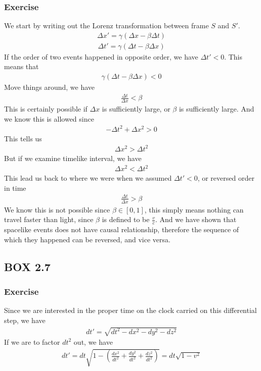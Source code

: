 \documentclass[12pt]{book}
\newcommand{\dydx}[2]{\frac{d #1}{d #2}}
\newcommand{\sqbkt}[1]{\left[ #1 \right]}
\newcommand{\paren}[1]{\left( #1 \right)}
\begin{document}
    \subsubsection{Exercise}
    We start by writing out the Lorenz transformation between frame $S$ and $S'$.
    \begin{align}
    \Delta x' = \gamma\paren{\Delta x - \beta \Delta t}
    \end{align}
    \begin{align}
    \Delta t' = \gamma\paren{\Delta t - \beta \Delta x}
    \end{align}
    If the order of two events happened in opposite order, we have $\Delta t' < 0$. This means that
    \begin{align}
    \gamma\paren{\Delta t - \beta \Delta x} < 0
    \end{align}
    Move things around, we have
    \begin{align}
    \frac{\Delta t}{\Delta x} < \beta 
    \end{align}
    This is certainly possible if $\Delta x$ is sufficiently large, or $\beta$ is sufficiently large. And we know this is allowed since 
    \begin{align}
    -\Delta t^2 + \Delta x^2 > 0
    \end{align}
    This tells us
    \begin{align}
    \Delta x^2 > \Delta t^2
    \end{align}
    But if we examine timelike interval, we have
    \begin{align}
    \Delta x^2 < \Delta t^2
    \end{align}
    This lead us back to where we were when we assumed $\Delta t' < 0$, or reversed order in time
    \begin{align}
    \frac{\Delta t}{\Delta x} > \beta 
    \end{align}
    We know this is not possible since $\beta \in \sqbkt{0,1}$, this simply means nothing can travel faster than light, since $\beta$ is defined to be $\frac{v}{c}$. And we have shown that spacelike events does not have causal relationship, therefore the sequence of which they happened can be reversed, and vice versa. 

    \subsection{BOX 2.7}
        \subsubsection{Exercise}
        Since we are interested in the proper time on the clock carried on this differential step, we have
        \begin{align}
        dt' = \sqrt{dt^2 - dx^2 -dy^2 -dz^2}
        \end{align}
        If we are to factor $dt^2$ out, we have
        \begin{align}
        dt' = dt\sqrt{1- \paren{\dydx{x^2}{t^2}+\dydx{y^2}{t^2}+\dydx{z^2}{t^2}}} = dt\sqrt{1-v^2}
        \end{align}
\end{document}
